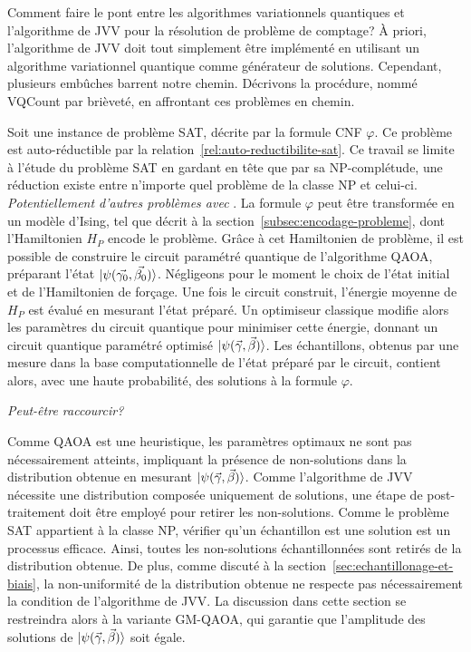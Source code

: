 Comment faire le pont entre les algorithmes variationnels quantiques et l'algorithme de JVV pour la résolution de problème de comptage? À priori, l'algorithme de JVV doit tout simplement être implémenté en utilisant un algorithme variationnel quantique comme générateur de solutions. Cependant, plusieurs embûches barrent notre chemin. Décrivons la procédure, nommé VQCount par brièveté, en affrontant ces problèmes en chemin.

Soit une instance de problème SAT, décrite par la formule CNF $\varphi$. Ce problème est auto-réductible par la relation~\ref{rel:auto-reductibilite-sat}. Ce travail se limite à l'étude du problème SAT en gardant en tête que par sa \textsf{NP}-complétude, une réduction existe entre n'importe quel problème de la classe \textsf{NP} et celui-ci. \textcolor{mydarkred}{\textit{Potentiellement d'autres problèmes avec }}. La formule $\varphi$ peut être transformée en un modèle d'Ising, tel que décrit à la section~\ref{subsec:encodage-probleme}, dont l'Hamiltonien $H_{P}$ encode le problème. Grâce à cet Hamiltonien de problème, il est possible de construire le circuit paramétré quantique de l'algorithme QAOA, préparant l'état $\ket{\psi(\vec{\gamma_{0}}, \vec{\beta_{0}})}$. Négligeons pour le moment le choix de l'état initial et de l'Hamiltonien de forçage. Une fois le circuit construit, l'énergie moyenne de $H_{P}$ est évalué en mesurant l'état préparé. Un optimiseur classique modifie alors les paramètres du circuit quantique pour minimiser cette énergie, donnant un circuit quantique paramétré optimisé $\ket{\psi(\vec{\gamma}, \vec{\beta})}$.
Les échantillons, obtenus par une mesure dans la base computationnelle de l'état préparé par le circuit, contient alors, avec une haute probabilité, des solutions à la formule $\varphi$.

\textcolor{mydarkred}{\textit{Peut-être raccourcir?}}

Comme QAOA est une heuristique, les paramètres optimaux ne sont pas nécessairement atteints, impliquant la présence de non-solutions dans la distribution obtenue en mesurant $\ket{\psi(\vec{\gamma}, \vec{\beta})}$. Comme l'algorithme de JVV nécessite une distribution composée uniquement de solutions, une étape de post-traitement doit être employé pour retirer les non-solutions. Comme le problème SAT appartient à la classe \textsf{NP}, vérifier qu'un échantillon est une solution est un processus efficace. Ainsi, toutes les non-solutions échantillonnées sont retirés de la distribution obtenue. De plus, comme discuté à la section~\ref{sec:echantillonage-et-biais}, la non-uniformité de la distribution obtenue ne respecte pas nécessairement la condition de l'algorithme de JVV. La discussion dans cette section se restreindra alors à la variante GM-QAOA, qui garantie que l'amplitude des solutions de $\ket{\psi(\vec{\gamma}, \vec{\beta})}$ soit égale. 

